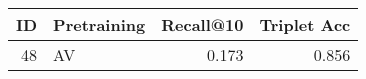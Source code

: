 \begin{tabular}{rlrr}
\toprule
 ID & Pretraining &  Recall@10 &  Triplet Acc \\
\midrule
 48 &          AV &      0.173 &        0.856 \\
\bottomrule
\end{tabular}
